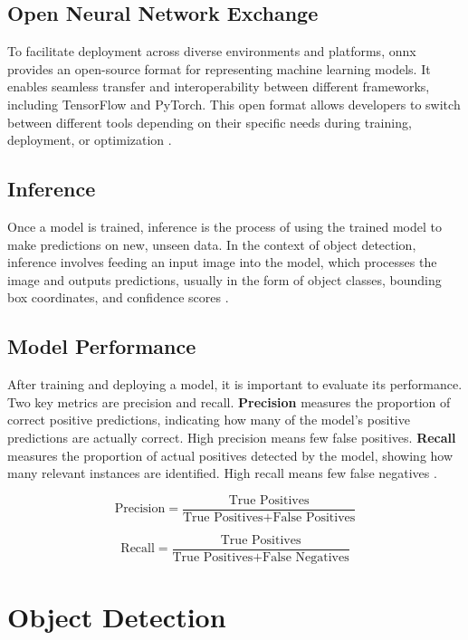\subsection{Open Neural Network Exchange}

To facilitate deployment across diverse environments and platforms, \gls{onnx} provides an open-source format for representing machine learning models. It enables seamless transfer and interoperability between different frameworks, including TensorFlow and PyTorch. This open format allows developers to switch between different tools depending on their specific needs during training, deployment, or optimization \cite{roboflow:onnx}.\\

\subsection{Inference}

Once a model is trained, inference is the process of using the trained model to make predictions on new, unseen data. In the context of object detection, inference involves feeding an input image into the model, which processes the image and outputs predictions, usually in the form of object classes, bounding box coordinates, and confidence scores \cite{nvidia:inference}. \\

\subsection{Model Performance}

After training and deploying a model, it is important to evaluate its performance. Two key metrics are precision and recall. \textbf{Precision} measures the proportion of correct positive predictions, indicating how many of the model’s positive predictions are actually correct. High precision means few false positives. \textbf{Recall} measures the proportion of actual positives detected by the model, showing how many relevant instances are identified. High recall means few false negatives \cite{builtin:precision-recall}.

\[
\text{Precision} = \frac{\text{True Positives}}{\text{True Positives} + \text{False Positives}}
\]

\[
\text{Recall} = \frac{\text{True Positives}}{\text{True Positives} + \text{False Negatives}}
\]

\section{Object Detection}
\label{sec:object-detection}

